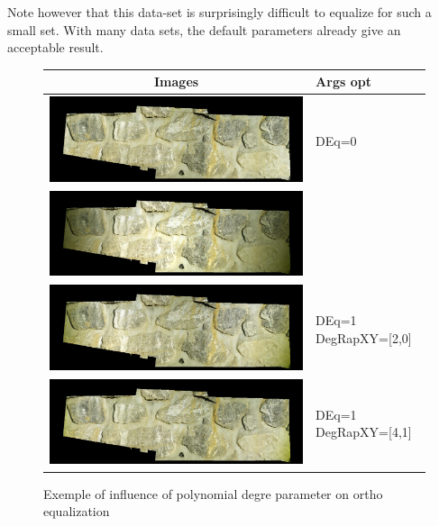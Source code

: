 Note however that this data-set is surprisingly difficult to equalize for such a
small set. With many data sets, the default parameters already give an acceptable result.

\begin{figure}
\begin{tabular} { | c | p{2 cm} |  } \hline
 Images   &    Args opt  \\  \hline \hline
\includegraphics[width=150mm]{FIGS/MurSaintMartin/Ortho-Eg-Test-Redr-0-0.jpg}  &    DEq=0 \\  \hline 
\includegraphics[width=150mm]{FIGS/MurSaintMartin/Ortho-Eg-Test-Redr-1-0.jpg}  &      \\  \hline 
\includegraphics[width=150mm]{FIGS/MurSaintMartin/Ortho-Eg-Test-Redr-1-2.jpg}  &    DEq=1 DegRapXY=[2,0] \\  \hline 
\includegraphics[width=150mm]{FIGS/MurSaintMartin/Ortho-Eg-Test-Redr-1-4_1.jpg}  &    DEq=1 DegRapXY=[4,1] \\  \hline 
\end{tabular}
\caption{Exemple of influence of polynomial degre parameter on ortho equalization}
\label{Tab:Ortho:Polyn}
\end{figure}


